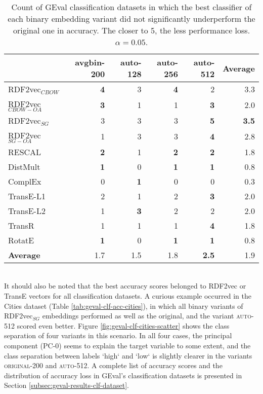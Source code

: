 \documentclass[11pt,titlepage,oneside,openany]{book}
\begin{document}
\begin{table}[h!]
\centering
\begin{tabular}{lrrrrr}
\toprule
{} &  avgbin-200 &  auto-128 &  auto-256 &  auto-512 &  \textbf{Average} \\
\midrule
RDF2vec$_{CBOW}$     &	\textbf{4} &         3  &	\textbf{4} &         2 & 3.3 \\
RDF2vec$_{CBOW-OA}$  &	\textbf{3} &         1  &         1  &	\textbf{3} & 2.0 \\
RDF2vec$_{SG}$       &           3  &         3  &         3  &	\textbf{5} & \textbf{3.5} \\
RDF2vec$_{SG-OA}$    &           1  &         3  &         3  &	\textbf{4} & 2.8 \\
RESCAL               &	\textbf{2} &         1  &	\textbf{2} &	\textbf{2} & 1.8 \\
DistMult             &	\textbf{1} &         0  &	\textbf{1} &	\textbf{1} & 0.8 \\
ComplEx              &           0  &	\textbf{1} &         0  &         0  & 0.3 \\
TransE-L1            &           2  &         1  &         2  &	\textbf{3} & 2.0 \\
TransE-L2            &           1  &	\textbf{3} &         2  &         2  & 2.0 \\
TransR               &           1  &         1  &         1  &	\textbf{4} & 1.8 \\
RotatE               &	\textbf{1} &         0  &	\textbf{1} &	\textbf{1} & 0.8 \\
\midrule
\textbf{Average}     &        1.7  &      1.5  &      1.8  &	\textbf{2.5} & 1.9 \\
\bottomrule
\end{tabular}
\caption{Count of GEval classification datasets in which the best classifier of each binary embedding variant did not significantly underperform the original one in accuracy. The closer to 5, the less performance loss. $\alpha=0.05$.}
\label{tab:geval-clf-acc-significantly-not-worse}
\end{table}
\\
It should also be noted that the best accuracy scores belonged to RDF2vec or TransE vectors for all classification datasets. A curious example occurred in the Cities dataset (Table \ref{tab:geval-clf-acc-cities}), in which all binary variants of RDF2vec$_{SG}$ embeddings performed as well as the original, and the variant \textsc{auto-512} scored even better. Figure \ref{fig:geval-clf-cities-scatter} shows the class separation of four variants in this scenario. In all four cases, the principal component (PC-0) seems to explain the target variable to some extent, and the class separation between labels `high` and `low` is slightly clearer in the variants \textsc{original-200} and \textsc{auto-512}. A complete list of accuracy scores and the distribution of accuracy loss in GEval's classification datasets is presented in Section \ref{subsec:geval-results-clf-dataset}.\\
\end{document}
